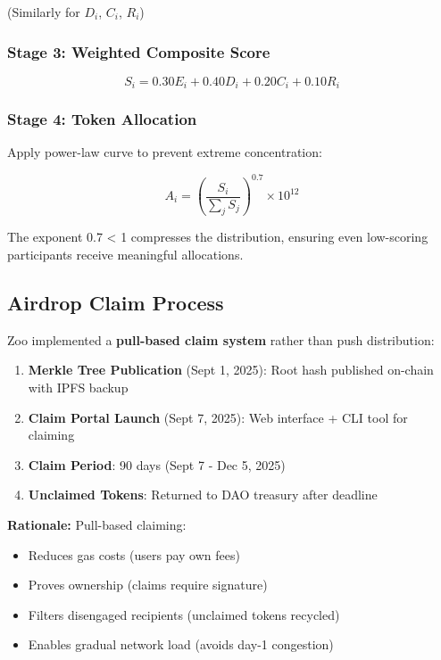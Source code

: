 (Similarly for $D_i$, $C_i$, $R_i$)

\subsubsection{Stage 3: Weighted Composite Score}

\begin{equation}
S_i = 0.30 E_i + 0.40 D_i + 0.20 C_i + 0.10 R_i
\end{equation}

\subsubsection{Stage 4: Token Allocation}

Apply power-law curve to prevent extreme concentration:

\begin{equation}
A_i = \left( \frac{S_i}{\sum_{j} S_j} \right)^{0.7} \times 10^{12}
\end{equation}

The exponent 0.7 < 1 compresses the distribution, ensuring even low-scoring participants receive meaningful allocations.

\subsection{Airdrop Claim Process}

Zoo implemented a \textbf{pull-based claim system} rather than push distribution:

\begin{enumerate}
\item \textbf{Merkle Tree Publication} (Sept 1, 2025): Root hash published on-chain with IPFS backup
\item \textbf{Claim Portal Launch} (Sept 7, 2025): Web interface + CLI tool for claiming
\item \textbf{Claim Period}: 90 days (Sept 7 - Dec 5, 2025)
\item \textbf{Unclaimed Tokens}: Returned to DAO treasury after deadline
\end{enumerate}

\textbf{Rationale:} Pull-based claiming:
\begin{itemize}
\item Reduces gas costs (users pay own fees)
\item Proves ownership (claims require signature)
\item Filters disengaged recipients (unclaimed tokens recycled)
\item Enables gradual network load (avoids day-1 congestion)
\end{itemize}

